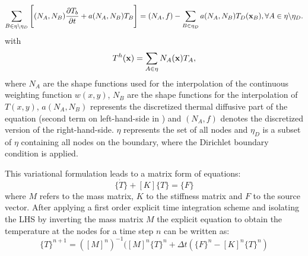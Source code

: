 \begin{equation}
	\sum_{B \in \eta \backslash \eta_D} \Bigg[(N_A,N_B) \frac{\partial T_b}{\partial t} + a(N_A,N_B)T_B \Bigg] = (N_A,f) - \sum_{B \in \eta_D} a(N_A,N_B)T_D(\boldsymbol{\mathbf{x}}_B), \forall A \in \eta \backslash \eta_D .
\end{equation}
with
\begin{equation}
	T^h(\boldsymbol{\mathbf{x}}) = \sum_{A\in \eta}N_A(\boldsymbol{\mathbf{x}})T_A ,
\end{equation}
where $N_A$ are the shape functions used for the interpolation of the continuous weighting function $w(x,y)$, $N_B$ are the shape functions for the interpolation of $T(x,y)$, $a(N_A, N_B)$ represents the discretized thermal diffusive part of the equation (second term on left-hand-side in ) and $(N_A,f)$ denotes the discretized version of the right-hand-side. $\eta$ represents the set of all nodes and $\eta_D$ is a subset of $\eta$ containing all nodes on the boundary, where the Dirichlet boundary condition is applied.

This variational formulation leads to a matrix form of equations:
\begin{equation}
	[M] \Big\{ \dot{T} \Big\} + [K] \Big\{ T \Big\} = \Big\{ F \Big\} 
\end{equation}
where $M$ refers to the mass matrix, $K$ to the stiffness matrix and $F$ to the source vector. After applying a first order explicit time integration scheme and isolating the LHS by inverting the mass matrix $M$ the explicit equation to obtain the temperature at the nodes for a time step $n$ can be written as:
\begin{equation}
	\label{eq:LHS}
	\{T\}^{n+1} = ([M]^n)^{-1}([M]^n\{T\}^n + \Delta t(\{F\}^n-[K]^n\{T\}^n)
\end{equation}

